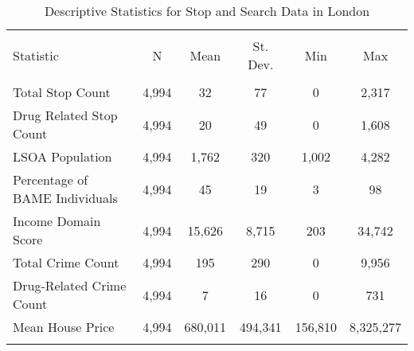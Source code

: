 
\begin{table}[!htbp] \centering 
  \caption{Descriptive Statistics for Stop and Search Data in London} 
  \label{tab:descriptive_london} 
\begin{tabular}{@{\extracolsep{5pt}}lccccc} 
\\[-1.8ex]\hline 
\hline \\[-1.8ex] 
Statistic & \multicolumn{1}{c}{N} & \multicolumn{1}{c}{Mean} & \multicolumn{1}{c}{St. Dev.} & \multicolumn{1}{c}{Min} & \multicolumn{1}{c}{Max} \\ 
\hline \\[-1.8ex] 
Total Stop Count & 4,994 & 32 & 77 & 0 & 2,317 \\ 
Drug Related Stop Count & 4,994 & 20 & 49 & 0 & 1,608 \\ 
LSOA Population & 4,994 & 1,762 & 320 & 1,002 & 4,282 \\ 
Percentage of BAME Individuals & 4,994 & 45 & 19 & 3 & 98 \\ 
Income Domain Score & 4,994 & 15,626 & 8,715 & 203 & 34,742 \\ 
Total Crime Count & 4,994 & 195 & 290 & 0 & 9,956 \\ 
Drug-Related Crime Count & 4,994 & 7 & 16 & 0 & 731 \\ 
Mean House Price & 4,994 & 680,011 & 494,341 & 156,810 & 8,325,277 \\ 
\hline \\[-1.8ex] 
\end{tabular} 
\end{table} 
